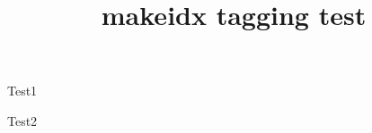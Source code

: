 \documentclass{article}
\title{makeidx tagging test}
\begin{document}
Test1

Test2
\printindex
\end{document}
